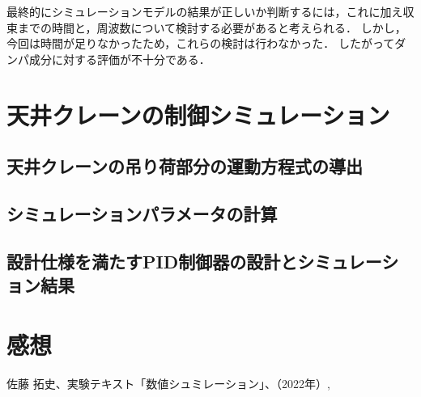\documentclass[dvipdfmx,titlepage,a4j]{jsarticle}  %
\begin{document}
最終的にシミュレーションモデルの結果が正しいか判断するには，これに加え収束までの時間と，周波数について検討する必要があると考えられる．
しかし，今回は時間が足りなかったため，これらの検討は行わなかった．
したがってダンパ成分に対する評価が不十分である．

\section{天井クレーンの制御シミュレーション}
\subsection{天井クレーンの吊り荷部分の運動方程式の導出}
\subsection{シミュレーションパラメータの計算}
\subsection{設計仕様を満たすPID制御器の設計とシミュレーション結果}

\section{感想}

\begin{thebibliography}{99}
   佐藤 拓史、実験テキスト「数値シュミレーション」、（2022年）,
\end{thebibliography}
\end{document}

